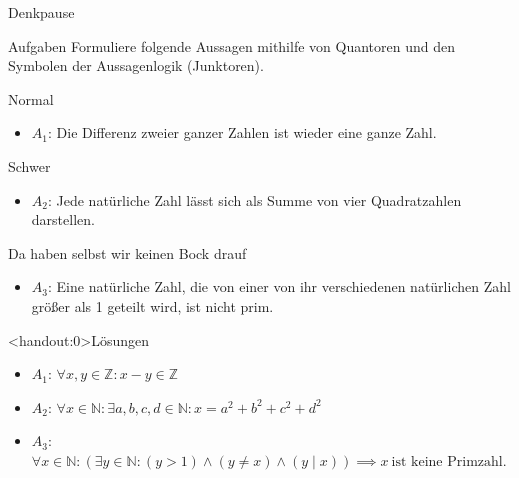 {
\begin{frame}{Denkpause}
    \begin{alertblock}{Aufgaben}
      Formuliere folgende Aussagen mithilfe von Quantoren und den Symbolen der Aussagenlogik (Junktoren). 
    \end{alertblock}
    \begin{block}{Normal}
    \begin{itemize}
        \item $A_1$: Die Differenz zweier ganzer Zahlen ist wieder eine ganze Zahl.
    \end{itemize}
    \end{block}
    \begin{block}{Schwer}
    \begin{itemize}
        \item $A_2$: Jede natürliche Zahl lässt sich als Summe von vier Quadratzahlen darstellen.
    \end{itemize}
    \end{block}
    \begin{block}{Da haben selbst wir keinen Bock drauf}
    \begin{itemize}
        \item $A_3$: Eine natürliche Zahl, die von einer von ihr verschiedenen natürlichen Zahl größer als 1 geteilt wird, ist nicht prim.
    \end{itemize}
    \end{block}
\end{frame}
}

{
\begin{frame}<handout:0>{Lösungen}
  \begin{itemize}[<+- | alert@+>]
        \item 
            $A_1$: $\forall x,y \in \mathbb{Z}: x-y \in \mathbb{Z}$
        \item
            $A_2$: $\forall x \in \mathbb{N}: \exists a, b, c, d \in \mathbb{N}: x = a^2 + b^2 + c^2 + d^2$
        \item
            $A_3$: $\forall x \in \mathbb{N}: \left(\exists y \in \mathbb{N}: (y>1) \wedge (y \neq x) \wedge (y \mid x)\right) \implies x\ \text{ist keine Primzahl}$.
    \end{itemize}
\end{frame}
}

